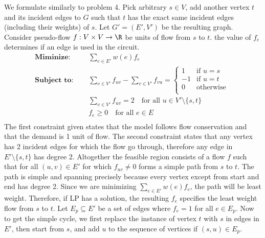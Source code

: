 \documentclass[11pt]{article}
\begin{document}
\begin{enumerate}
    \begin{solution}
        We formulate similarly to problem 4. Pick arbitrary $s\in V$, add another vertex $t$ and its incident edges to $G$ such that $t$ has the exact same incident edges (including their weights) of $s$. Let $G' = (E', V')$ be the resulting graph. Consider pseudo-flow $f:V\times V \to \R$ be units of flow from $s$ to $t$. the value of $f_e$ determines if an edge is used in the circuit.
        \begin{align*}
            \textbf{Miminize: }\quad & \sum_{e\in E'} w(e)f_e \\
            \textbf{Subject to: } \quad & \sum_{v\in V'} f_{uv} - \sum_{v\in V'} f_{vu} = 
                                                    \begin{cases}
                                                        1 & \text{if } u = s\\
                                                        -1 & \text{if } u = t\\
                                                        0 & \text{otherwise }\\
                                                    \end{cases}\\
                                \quad & \sum_{v\in V'} f_{uv} = 2 \quad \text{for all } u\in V' \setminus \{ s,t\} \\
                                \quad & f_e \geq 0 \quad \text{for all } e\in E\\
        \end{align*}
        The first constraint given states that the model follows flow conservation and that the demand is 1 unit of flow. The second constraint states that any vertex has 2 incident edges for which the flow go through, therefore any edge in $E' \setminus \{s,t \}$ has degree 2. Altogether the feasible region consists of a flow $f$ such that for all $(u,v)\in E'$ for which $f_{uv}\neq 0$ forms a simple path from $s$ to $t$. The path is simple and spanning precisely because every vertex except from start and end has degree 2. Since we are minimizing $\sum_{e\in E'} w(e)f_e$, the path will be least weight. Therefore, if LP has a solution, the resulting $f_e$ specifies the least weight flow from $s$ to $t$. Let $E_p \subseteq E'$ be a set of edges where $f_e = 1$ for all $e\in E_p$. Now to get the simple cycle, we first replace the instance of vertex $t$ with $s$ in edges in $E'$, then start from $s$, and add $u$ to the sequence of vertices if $(s,u) \in E_p$. 
    \end{solution}


\end{enumerate}
\end{document}

